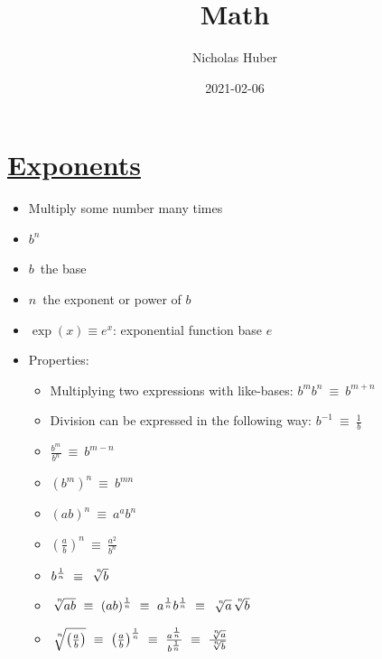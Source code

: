 \documentclass{article}
\title{Math}
\date{2021-02-06}
\author{Nicholas Huber}
\begin{document}
  \maketitle
  \newpage
  \tableofcontents
  \newpage

\section{\underline{Exponents}}
\begin{itemize}
  \item Multiply some number many times
  \item $b^{n}$
  \item $b$\ the base
  \item $n$\ the exponent or power of $b$
  \item $\exp(x)\equiv e^{x}$: exponential function base $e$
  \item Properties:
    \begin{itemize}
      \item Multiplying two expressions with like-bases: $b^{m}b^{n}\ \equiv\ b^{m+n}$
      \item Division can be expressed in the following way: $b^{-1}\ \equiv\ \frac{1}{b}$
      \item $\frac{b^{m}}{b^{n}}\ \equiv\ b^{m-n}$
      \item $(b^{m})^{n}\ \equiv\ b^{mn}$
      \item $(ab)^{n}\ \equiv\ a^{a}b^{n}$
      \item $\left(\frac{a}{b}\right)^{n}\ \equiv\ \frac{a^{2}}{b^{n}}$
      \item $b^{\frac{1}{n}}\ \equiv\ \sqrt[\leftroot{-3}\uproot{3}n]{b}$
      \item $\sqrt[\leftroot{-3}\uproot{3}n]{ab}\ \equiv\ (ab)^{\frac{1}{n}}\ \equiv\ a^{\frac{1}{n}}b^{\frac{1}{n}}\ \equiv\ \sqrt[\leftroot{-3}\uproot{3}n]{a}\sqrt[\leftroot{-3}\uproot{3}n]{b}$
      \item $\sqrt[\leftroot{-3}\uproot{3}n]{\left(\frac{a}{b}\right)}\ \equiv\ \left(\frac{a}{b}\right)^{\frac{1}{n}}\ \equiv\ \frac{a^{\frac{1}{n}}}{b^{\frac{1}{n}}}\ \equiv\ \frac{\sqrt[\leftroot{-2}\uproot{2}n]{a}}{\sqrt[\leftroot{-1}\uproot{1}n]{b}} $
    \end{itemize}
\end{itemize}
\end{document}
